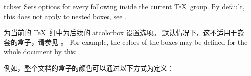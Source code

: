 \begin{docCommand}{tcbset}{}
Sets options for every following  inside the current \TeX\ group.
By default, this does not apply to nested boxes, see .

为当前的 \TeX\ 组中为后续的 a{tcolorbox} 设置选项。 默认情况下，这不适用于嵌套的盒子，请参见 。\parpar
For example, the colors of the boxes may be defined for the whole document by this:


例如，整个文档的盒子的颜色可以通过以下方式为定义：
  
\begin{dispListing}
\end{dispListing}
\end{docCommand}